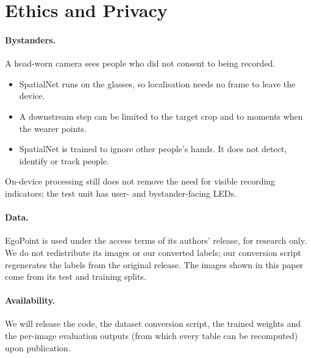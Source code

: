 \section{Ethics and Privacy}\label{sec:ethics}

\paragraph{Bystanders.} A head-worn camera sees people who did not consent to being recorded.
\begin{itemize}
\item SpatialNet runs on the glasses, so localisation needs no frame to leave the device.
\item A downstream step can be limited to the target crop and to moments when the wearer points.
\item SpatialNet is trained to ignore other people's hands. It does not detect, identify or track people.
\end{itemize}
On-device processing still does not remove the need for visible recording indicators; the test unit has user- and bystander-facing LEDs.

\paragraph{Data.} EgoPoint is used under the access terms of its authors' release, for research only. We do not redistribute its images or our converted labels; our conversion script regenerates the labels from the original release. The images shown in this paper come from its test and training splits. 

\paragraph{Availability.} We will release the code, the dataset conversion script, the trained weights and the per-image evaluation outputs (from which every table can be recomputed) upon publication.


